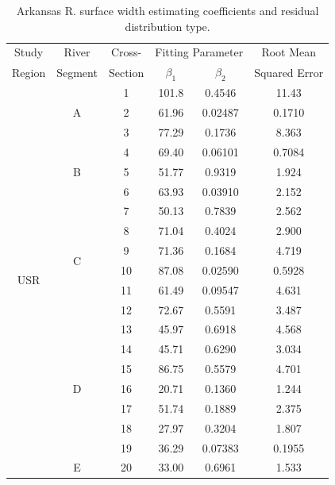 \begin{linenumbers}
\begin{table}[htbp]
  \centering
  \caption[Arkansas R. surface width estimating coefficients and residual distribution type.]{Arkansas R. surface width estimating coefficients and residual distribution type.}
  \label{tab:alphabetavals}
  \begin{tabular}{cccccc}
    \toprule
    Study & River & Cross- & \multicolumn{2}{c}{Fitting Parameter} & Root Mean\\\cline{4-5}
    Region & Segment & Section & $\beta_1$ & $\beta_2$ & Squared Error\\
    \midrule
    \midrule
    \multirow{21}{*}{USR}& \multirow{3}{*}{A} 		& 1 & 101.8	& 0.4546	& 11.43	\\
    						&						& 2 & 61.96	& 0.02487	& 0.1710	\\
    						&						& 3 & 77.29	& 0.1736	& 8.363	\\\cline{2-6}
          					& \multirow{3}{*}{B}	& 4 & 69.40	& 0.06101	& 0.7084	\\
          					&						& 5 & 51.77	& 0.9319	& 1.924	\\
          					&						& 6 & 63.93	& 0.03910	& 2.152	\\\cline{2-6}
          					& \multirow{6}{*}{C} 	& 7 & 50.13	& 0.7839	& 2.562	\\
          					&						& 8 & 71.04	& 0.4024	& 2.900	\\
          					&						& 9 & 71.36	& 0.1684	& 4.719	\\
          					&						& 10& 87.08	& 0.02590	& 0.5928	\\
          					&						& 11& 61.49	& 0.09547	& 4.631	\\
          					&						& 12& 72.67	& 0.5591	& 3.487	\\\cline{2-6}
					        & \multirow{7}{*}{D} 	& 13& 45.97	& 0.6918	& 4.568	\\
					        &						& 14& 45.71	& 0.6290	& 3.034	\\
					        &						& 15& 86.75	& 0.5579	& 4.701	\\
					        &						& 16& 20.71	& 0.1360	& 1.244	\\
					        &						& 17& 51.74	& 0.1889	& 2.375	\\
					        &						& 18& 27.97	& 0.3204	& 1.807	\\
					        &						& 19& 36.29	& 0.07383	& 0.1955	\\\cline{2-6}		        
          					& \multirow{2}{*}{E} 	& 20& 33.00	& 0.6961	& 1.533	\\

\end{tabular}
\end{table}
\end{linenumbers}
